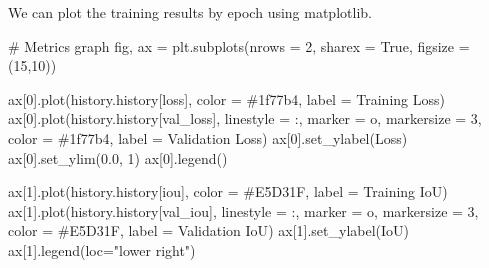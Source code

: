 \documentclass[
  letterpaper,
  DIV=11,
  numbers=noendperiod]{scrreprt}
\newenvironment{Shaded}{\begin{snugshade}}{\end{snugshade}}
\newcommand{\CommentTok}[1]{\textcolor[rgb]{0.37,0.37,0.37}{#1}}
\newcommand{\DecValTok}[1]{\textcolor[rgb]{0.68,0.00,0.00}{#1}}
\newcommand{\FloatTok}[1]{\textcolor[rgb]{0.68,0.00,0.00}{#1}}
\newcommand{\NormalTok}[1]{\textcolor[rgb]{0.00,0.23,0.31}{#1}}
\newcommand{\OperatorTok}[1]{\textcolor[rgb]{0.37,0.37,0.37}{#1}}
\newcommand{\StringTok}[1]{\textcolor[rgb]{0.13,0.47,0.30}{#1}}
\newcommand{\VariableTok}[1]{\textcolor[rgb]{0.07,0.07,0.07}{#1}}
\begin{document}
We can plot the training results by epoch using matplotlib.

\begin{Shaded}
\begin{Highlighting}[]
\CommentTok{\# Metrics graph}
\NormalTok{fig, ax }\OperatorTok{=}\NormalTok{ plt.subplots(nrows }\OperatorTok{=} \DecValTok{2}\NormalTok{, sharex }\OperatorTok{=} \VariableTok{True}\NormalTok{, figsize }\OperatorTok{=}\NormalTok{ (}\DecValTok{15}\NormalTok{,}\DecValTok{10}\NormalTok{))}

\NormalTok{ax[}\DecValTok{0}\NormalTok{].plot(history.history[}\StringTok{\textquotesingle{}loss\textquotesingle{}}\NormalTok{], color }\OperatorTok{=} \StringTok{\textquotesingle{}\#1f77b4\textquotesingle{}}\NormalTok{, label }\OperatorTok{=} \StringTok{\textquotesingle{}Training Loss\textquotesingle{}}\NormalTok{)}
\NormalTok{ax[}\DecValTok{0}\NormalTok{].plot(history.history[}\StringTok{\textquotesingle{}val\_loss\textquotesingle{}}\NormalTok{], linestyle }\OperatorTok{=} \StringTok{\textquotesingle{}:\textquotesingle{}}\NormalTok{, marker }\OperatorTok{=} \StringTok{\textquotesingle{}o\textquotesingle{}}\NormalTok{, markersize }\OperatorTok{=} \DecValTok{3}\NormalTok{, color }\OperatorTok{=} \StringTok{\textquotesingle{}\#1f77b4\textquotesingle{}}\NormalTok{, label }\OperatorTok{=} \StringTok{\textquotesingle{}Validation Loss\textquotesingle{}}\NormalTok{)}
\NormalTok{ax[}\DecValTok{0}\NormalTok{].set\_ylabel(}\StringTok{\textquotesingle{}Loss\textquotesingle{}}\NormalTok{)}
\NormalTok{ax[}\DecValTok{0}\NormalTok{].set\_ylim(}\FloatTok{0.0}\NormalTok{, }\DecValTok{1}\NormalTok{)}
\NormalTok{ax[}\DecValTok{0}\NormalTok{].legend()}

\NormalTok{ax[}\DecValTok{1}\NormalTok{].plot(history.history[}\StringTok{\textquotesingle{}iou\textquotesingle{}}\NormalTok{], color }\OperatorTok{=} \StringTok{\textquotesingle{}\#E5D31F\textquotesingle{}}\NormalTok{, label }\OperatorTok{=} \StringTok{\textquotesingle{}Training IoU\textquotesingle{}}\NormalTok{)}
\NormalTok{ax[}\DecValTok{1}\NormalTok{].plot(history.history[}\StringTok{\textquotesingle{}val\_iou\textquotesingle{}}\NormalTok{], linestyle }\OperatorTok{=} \StringTok{\textquotesingle{}:\textquotesingle{}}\NormalTok{, marker }\OperatorTok{=} \StringTok{\textquotesingle{}o\textquotesingle{}}\NormalTok{, markersize }\OperatorTok{=} \DecValTok{3}\NormalTok{, color }\OperatorTok{=} \StringTok{\textquotesingle{}\#E5D31F\textquotesingle{}}\NormalTok{, label }\OperatorTok{=} \StringTok{\textquotesingle{}Validation IoU\textquotesingle{}}\NormalTok{)}
\NormalTok{ax[}\DecValTok{1}\NormalTok{].set\_ylabel(}\StringTok{\textquotesingle{}IoU\textquotesingle{}}\NormalTok{)}
\NormalTok{ax[}\DecValTok{1}\NormalTok{].legend(loc}\OperatorTok{=}\StringTok{"lower right"}\NormalTok{)}


\end{Highlighting}
\end{Shaded}
\end{document}
